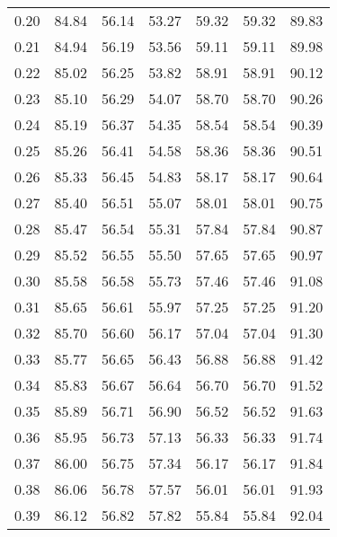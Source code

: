 \begin{tabular}{|c|c|c|c|c|c|c|}
      0.20 &     84.84 &     56.14 &      53.27 &   59.32 &      59.32 &         89.83 \\
      0.21 &     84.94 &     56.19 &      53.56 &   59.11 &      59.11 &         89.98 \\
      0.22 &     85.02 &     56.25 &      53.82 &   58.91 &      58.91 &         90.12 \\
      0.23 &     85.10 &     56.29 &      54.07 &   58.70 &      58.70 &         90.26 \\
      0.24 &     85.19 &     56.37 &      54.35 &   58.54 &      58.54 &         90.39 \\
      0.25 &     85.26 &     56.41 &      54.58 &   58.36 &      58.36 &         90.51 \\
      0.26 &     85.33 &     56.45 &      54.83 &   58.17 &      58.17 &         90.64 \\
      0.27 &     85.40 &     56.51 &      55.07 &   58.01 &      58.01 &         90.75 \\
      0.28 &     85.47 &     56.54 &      55.31 &   57.84 &      57.84 &         90.87 \\
      0.29 &     85.52 &     56.55 &      55.50 &   57.65 &      57.65 &         90.97 \\
      0.30 &     85.58 &     56.58 &      55.73 &   57.46 &      57.46 &         91.08 \\
      0.31 &     85.65 &     56.61 &      55.97 &   57.25 &      57.25 &         91.20 \\
      0.32 &     85.70 &     56.60 &      56.17 &   57.04 &      57.04 &         91.30 \\
      0.33 &     85.77 &     56.65 &      56.43 &   56.88 &      56.88 &         91.42 \\
      0.34 &     85.83 &     56.67 &      56.64 &   56.70 &      56.70 &         91.52 \\
      0.35 &     85.89 &     56.71 &      56.90 &   56.52 &      56.52 &         91.63 \\
      0.36 &     85.95 &     56.73 &      57.13 &   56.33 &      56.33 &         91.74 \\
      0.37 &     86.00 &     56.75 &      57.34 &   56.17 &      56.17 &         91.84 \\
      0.38 &     86.06 &     56.78 &      57.57 &   56.01 &      56.01 &         91.93 \\
      0.39 &     86.12 &     56.82 &      57.82 &   55.84 &      55.84 &         92.04 \\

\end{tabular}

